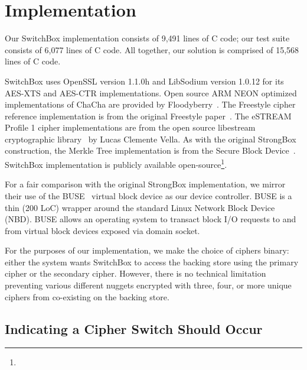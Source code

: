 \section{Implementation}


Our SwitchBox implementation consists of 9,491 lines of C code; our test suite
consists of 6,077 lines of C code. All together, our solution is comprised of
15,568 lines of C code.

SwitchBox uses OpenSSL version 1.1.0h and LibSodium version 1.0.12 for its
AES-XTS and AES-CTR implementations. Open source ARM NEON optimized
implementations of ChaCha are provided by Floodyberry~\cite{Floodyberry}. The
Freestyle cipher reference implementation is from the original Freestyle
paper~\cite{Freestyle}. The eSTREAM Profile 1 cipher implementations are from
the open source libestream cryptographic library~\cite{libestream} by Lucas
Clemente Vella. As with the original StrongBox construction, the Merkle Tree
implementation is from the Secure Block Device~\cite{SBD}. SwitchBox
implementation is publicly available open-source\footnote{\SystemURI}.

For a fair comparison with the original StrongBox implementation, we mirror
their use of the BUSE~\cite{BUSE} virtual block device as our device controller.
BUSE is a thin (200 LoC) wrapper around the standard Linux Network Block Device
(NBD). BUSE allows an operating system to transact block I/O requests to and
from virtual block devices exposed via domain socket.

For the purposes of our implementation, we make the choice of ciphers binary:
either the system wants SwitchBox to access the backing store using the primary
cipher or the secondary cipher. However, there is no technical limitation
preventing various different nuggets encrypted with three, four, or more unique
ciphers from co-existing on the backing store. 

\subsection{Indicating a Cipher Switch Should Occur}

